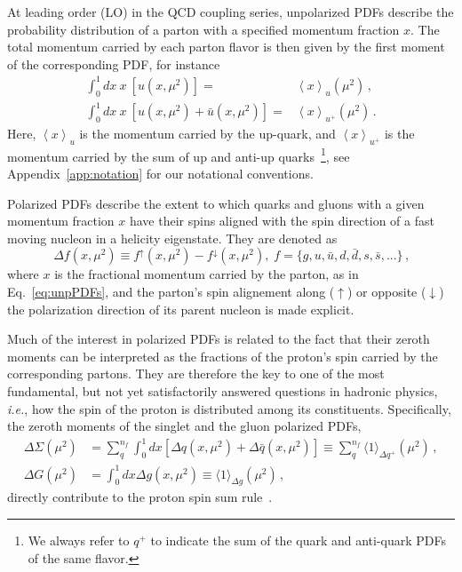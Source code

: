 At leading order (LO) in the QCD coupling series, unpolarized PDFs 
describe the probability distribution of a parton with a specified 
momentum fraction $x$.
%
The total momentum carried by each parton flavor is then given by 
the first moment of the corresponding PDF, for instance
%
\begin{align}
\int_{0}^{1}dx\ x\ \left[u(x,\mu^2)\right] 
= & {}  
\left\langle x\right\rangle _{u}(\mu^2)\,, \label{eq:umoment1}\\
\int_{0}^{1}dx\ x\ \left[u(x,\mu^2)+\bar{u}(x,\mu^2)\right] 
= & {} 
\left\langle x\right\rangle _{u^{+}}(\mu^2)\,. \label{eq:uplusmoment1}
\end{align}
%
Here, $\left\langle x\right\rangle _{u}$ is the momentum
carried by the up-quark, and $\left\langle x\right\rangle _{u^{+}}$ is
the momentum carried by the sum of up and anti-up quarks~\footnote{We always 
 refer to $q^+$ to indicate the sum of the quark and anti-quark PDFs of the 
 same flavor.},
see Appendix~\ref{app:notation} for our notational conventions.

Polarized PDFs describe the extent to which quarks and gluons 
with a given momentum fraction $x$ have their spins aligned with the spin 
direction of a fast moving nucleon in a helicity eigenstate. 
%
They are denoted as 
\begin{equation}
\Delta f(x,\mu^2) \equiv f^{\uparrow}(x,\mu^2) - f^{\downarrow}(x,\mu^2)
\mbox{,} \ \ f=\{g,u,\bar{u},d,\bar{d},s,\bar{s},...\}
\,\mbox{,}
\label{eq:polPDFs}
\end{equation}
where $x$ is the fractional 
momentum carried by the parton, as in Eq.~\eqref{eq:unpPDFs},  
and the parton's spin alignement along ($\uparrow$) or opposite 
($\downarrow$) the polarization direction of its parent nucleon
is made explicit.

Much of the interest in polarized PDFs is related to the fact that 
their zeroth moments can be interpreted as the fractions of the proton's 
spin carried by the corresponding partons.
%
They are therefore the key to one of the most fundamental, 
but not yet satisfactorily answered questions in hadronic physics,
{\it i.e.}, how the spin of the proton is distributed among its constituents.
%
Specifically, the zeroth moments of the singlet and the gluon polarized PDFs,
\begin{align}
\Delta\Sigma(\mu^2)
& =
\sum_{q}^{n_f}\int_0^1 dx 
\left[\Delta q(x, \mu^2) + \Delta\bar{q}(x, \mu^2)\right]
\equiv
\sum_q^{n_f}\langle 1 \rangle_{\Delta q^+}(\mu^2)\,,
\\
\Delta G(\mu^2)
& =
\int_0^1 dx \Delta g(x,\mu^2)
\equiv
\langle 1 \rangle_{\Delta g}(\mu^2)
\,,
\label{eq:moments}
\end{align}
directly contribute to the proton spin sum rule~\cite{Leader:2013jra}.

